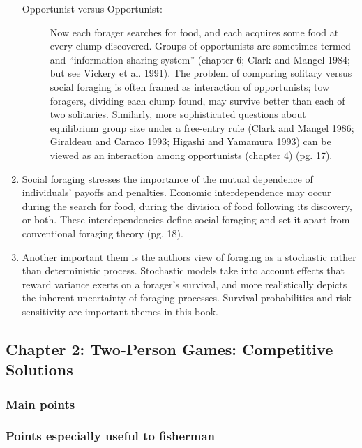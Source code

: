 \documentclass[a4paper,11pt]{article}
\begin{document}
\begin{enumerate}
\begin{description}
\item[Opportunist versus Opportunist:] Now each forager searches for food, and each acquires some food at every clump discovered. Groups of opportunists are sometimes termed and ``information-sharing system'' (chapter 6; Clark and Mangel 1984; but see Vickery et al. 1991). The problem of comparing solitary versus social foraging is often framed as interaction of opportunists; tow foragers, dividing each clump found, may survive better than each of two solitaries. Similarly, more sophisticated questions about equilibrium group size under a free-entry rule (Clark and Mangel 1986; Giraldeau and Caraco 1993; Higashi and Yamamura 1993) can be viewed as an interaction among opportunists (chapter 4) (pg. 17). 
\end{description}
\item Social foraging stresses the importance of the mutual dependence of individuals' payoffs and penalties. Economic interdependence may occur during the search for food, during the division of food following its discovery, or both. These interdependencies define social foraging and set it apart from conventional foraging theory (pg. 18). 
\item Another important them is the authors view of foraging as a stochastic rather than deterministic process. Stochastic models take into account effects that reward variance exerts on a forager's survival, and more realistically depicts the inherent uncertainty of foraging processes. Survival probabilities and risk sensitivity are important themes in this book. 
\end{enumerate}

\subsection*{Chapter 2: Two-Person Games: Competitive Solutions}
\subsubsection*{Main points}

\subsubsection*{Points especially useful to fisherman} 
\end{document}
